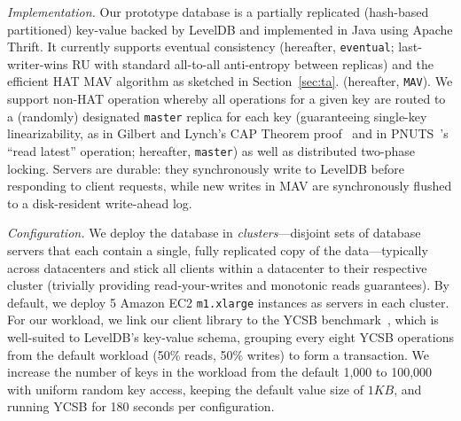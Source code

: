 \vspace{.5em}\noindent\textit{Implementation.} Our prototype database
is a partially replicated (hash-based partitioned) key-value backed by
LevelDB and implemented in Java using Apache Thrift. It currently
supports eventual consistency (hereafter, \texttt{eventual};
last-writer-wins RU with standard all-to-all anti-entropy between
replicas) and the efficient HAT MAV algorithm as sketched in
Section~\ref{sec:ta}. (hereafter, \texttt{MAV}). We support non-HAT
operation whereby all operations for a given key are routed to a
(randomly) designated \texttt{master} replica for each key
(guaranteeing single-key linearizability, as in Gilbert and Lynch's
CAP Theorem proof~\cite{gilbert-cap} and in PNUTS~\cite{pnuts}'s
``read latest'' operation; hereafter, \texttt{master}) as well as
distributed two-phase locking. Servers are durable: they synchronously
write to LevelDB before responding to client requests, while new
writes in MAV are synchronously flushed to a disk-resident write-ahead
log.

\vspace{.5em}\noindent\textit{Configuration.} We deploy the database
in \textit{clusters}---disjoint sets of database servers that each
contain a single, fully replicated copy of the data---typically across
datacenters and stick all clients within a datacenter to their
respective cluster (trivially providing read-your-writes and monotonic
reads guarantees). By default, we deploy 5 Amazon EC2
\texttt{m1.xlarge} instances as servers in each cluster. For our
workload, we link our client library to the YCSB
benchmark~\cite{ycsb}, which is well-suited to LevelDB's key-value
schema, grouping every eight YCSB operations from the default workload
(50\% reads, 50\% writes) to form a transaction. We increase the
number of keys in the workload from the default 1,000 to 100,000 with
uniform random key access, keeping the default value size of $1KB$,
and running YCSB for 180 seconds per configuration.

